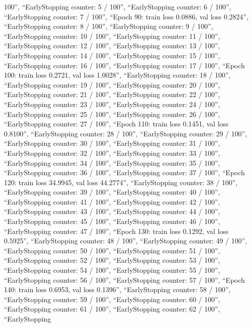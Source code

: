 \documentclass[
]{article}
\begin{document}
100\n'', ``EarlyStopping counter: 5 / 100\n'', ``EarlyStopping counter:
6 / 100\n'', ``EarlyStopping counter: 7 / 100\n'', ``Epoch 90: train
loss 0.0886, val loss 0.2824\n'', ``EarlyStopping counter: 8 / 100\n'',
``EarlyStopping counter: 9 / 100\n'', ``EarlyStopping counter: 10 /
100\n'', ``EarlyStopping counter: 11 / 100\n'', ``EarlyStopping counter:
12 / 100\n'', ``EarlyStopping counter: 13 / 100\n'', ``EarlyStopping
counter: 14 / 100\n'', ``EarlyStopping counter: 15 / 100\n'',
``EarlyStopping counter: 16 / 100\n'', ``EarlyStopping counter: 17 /
100\n'', ``Epoch 100: train loss 0.2721, val loss 1.0028\n'',
``EarlyStopping counter: 18 / 100\n'', ``EarlyStopping counter: 19 /
100\n'', ``EarlyStopping counter: 20 / 100\n'', ``EarlyStopping counter:
21 / 100\n'', ``EarlyStopping counter: 22 / 100\n'', ``EarlyStopping
counter: 23 / 100\n'', ``EarlyStopping counter: 24 / 100\n'',
``EarlyStopping counter: 25 / 100\n'', ``EarlyStopping counter: 26 /
100\n'', ``EarlyStopping counter: 27 / 100\n'', ``Epoch 110: train loss
0.1451, val loss 0.8100\n'', ``EarlyStopping counter: 28 / 100\n'',
``EarlyStopping counter: 29 / 100\n'', ``EarlyStopping counter: 30 /
100\n'', ``EarlyStopping counter: 31 / 100\n'', ``EarlyStopping counter:
32 / 100\n'', ``EarlyStopping counter: 33 / 100\n'', ``EarlyStopping
counter: 34 / 100\n'', ``EarlyStopping counter: 35 / 100\n'',
``EarlyStopping counter: 36 / 100\n'', ``EarlyStopping counter: 37 /
100\n'', ``Epoch 120: train loss 34.9945, val loss 44.2774\n'',
``EarlyStopping counter: 38 / 100\n'', ``EarlyStopping counter: 39 /
100\n'', ``EarlyStopping counter: 40 / 100\n'', ``EarlyStopping counter:
41 / 100\n'', ``EarlyStopping counter: 42 / 100\n'', ``EarlyStopping
counter: 43 / 100\n'', ``EarlyStopping counter: 44 / 100\n'',
``EarlyStopping counter: 45 / 100\n'', ``EarlyStopping counter: 46 /
100\n'', ``EarlyStopping counter: 47 / 100\n'', ``Epoch 130: train loss
0.1292, val loss 0.5925\n'', ``EarlyStopping counter: 48 / 100\n'',
``EarlyStopping counter: 49 / 100\n'', ``EarlyStopping counter: 50 /
100\n'', ``EarlyStopping counter: 51 / 100\n'', ``EarlyStopping counter:
52 / 100\n'', ``EarlyStopping counter: 53 / 100\n'', ``EarlyStopping
counter: 54 / 100\n'', ``EarlyStopping counter: 55 / 100\n'',
``EarlyStopping counter: 56 / 100\n'', ``EarlyStopping counter: 57 /
100\n'', ``Epoch 140: train loss 0.6953, val loss 0.1396\n'',
``EarlyStopping counter: 58 / 100\n'', ``EarlyStopping counter: 59 /
100\n'', ``EarlyStopping counter: 60 / 100\n'', ``EarlyStopping counter:
61 / 100\n'', ``EarlyStopping counter: 62 / 100\n'', ``EarlyStopping
\end{document}
